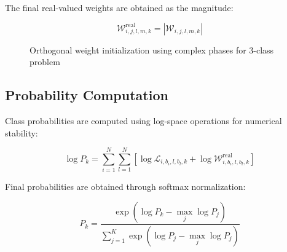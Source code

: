 \documentclass[journal]{IEEEtran}
\begin{document}
The final real-valued weights are obtained as the magnitude:

\begin{equation}
\mathcal{W}^{\text{real}}_{i,j,l,m,k} = |\mathcal{W}_{i,j,l,m,k}|
\end{equation}

\begin{figure}[!ht]
\centering
{}
\caption{Orthogonal weight initialization using complex phases for 3-class problem}
\label{fig:orthogonal_weights}
\end{figure}

\subsection{Probability Computation}

Class probabilities are computed using log-space operations for numerical stability:

\begin{equation}
\log P_k = \sum_{i=1}^N \sum_{l=1}^N \left[ \log \mathcal{L}_{i,b_i,l,b_l,k} + \log \mathcal{W}^{\text{real}}_{i,b_i,l,b_l,k} \right]
\end{equation}

Final probabilities are obtained through softmax normalization:

\begin{equation}
P_k = \frac{\exp(\log P_k - \max_j \log P_j)}{\sum_{j=1}^K \exp(\log P_j - \max_j \log P_j)}
\end{equation}
\end{document}
